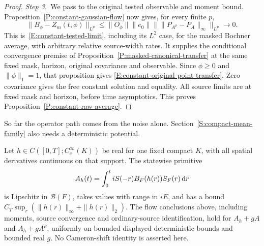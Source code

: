 \begin{proof}
  \medskip
  \noindent\textit{Step 3.~}We pass to the original tested observable and
  moment bound.
  Proposition~\ref{P:constant-gaussian-flow} now gives, for every finite $p$,
  \[
    \|B_\phi-Z_m(t,\phi)\|_{L^p}
    \le\|O_\phi\|\|e_0\|
    \big\|\|P_{A^\rho}-P_A\|_\infty\big\|_{L^p}
    \longrightarrow0.
  \]
  This is~\eqref{E:constant-tested-limit}, including its $L^2$ case, for the
  masked Bochner average, with arbitrary relative source-width rates. It
  supplies the conditional convergence premise of
  Proposition~\ref{P:masked-canonical-transfer} at the same fixed mask, horizon,
  original covariance and observable. Since $\phi \ge 0$ and $\|\phi\|_1 = 1$,
  that proposition gives \eqref{E:constant-original-point-transfer}. Zero
  covariance gives the free constant solution and equality. All source limits
  are at fixed mask and horizon, before time asymptotics. This proves
  Proposition~\ref{P:constant-raw-average}.
\end{proof}

So far the operator path comes from the noise alone.
Section~\ref{S:compact-mean-family} also needs a deterministic potential.

\begin{proposition}\label{P:constant-compact-base}
  Let $h \in C([0,T];C_c^\infty(K))$ be real for one fixed compact $K$, with all
  spatial derivatives continuous on that support. The statewise primitive
  \[
    A_h(t)=\int_0^t iS(-r)B_F(h(r))S_F(r)\,\mathrm{d} r
  \]
  is Lipschitz in $\mathcal{B}(F)$, takes values with range in $iE$, and has a
  bound $C_T\sup_r(\|h(r)\|_\infty+\|h(r)\|_2)$. The flow conclusions above,
  including moments, source convergence and ordinary-source identification, hold
  for $A_h+gA$ and $A_h+gA^\rho$, uniformly on bounded displayed deterministic
  bounds and bounded real $g$. No Cameron-shift identity is asserted here.
\end{proposition}

